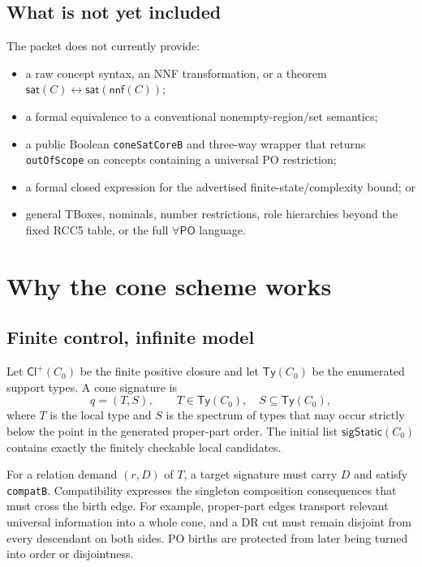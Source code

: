\documentclass[11pt]{article}
\newcommand{\PO}{\mathsf{PO}}
\newcommand{\Ty}{\mathsf{Ty}}
\newcommand{\Cl}{\mathsf{Cl}^{+}}
\newcommand{\code}[1]{\texttt{#1}}
\begin{document}
\subsection{What is not yet included}

The packet does not currently provide:
\begin{itemize}
  \item a raw concept syntax, an NNF transformation, or a theorem
  $\mathsf{sat}(C)\leftrightarrow\mathsf{sat}(\mathsf{nnf}(C))$;
  \item a formal equivalence to a conventional nonempty-region/set semantics;
  \item a public Boolean \code{coneSatCoreB} and three-way wrapper that returns
  \code{outOfScope} on concepts containing a universal PO restriction;
  \item a formal closed expression for the advertised finite-state/complexity bound;
  or
  \item general TBoxes, nominals, number restrictions, role hierarchies beyond the
  fixed RCC5 table, or the full $\forall\PO$ language.
\end{itemize}

\section{Why the cone scheme works}

\subsection{Finite control, infinite model}

Let $\Cl(C_0)$ be the finite positive closure and let $\Ty(C_0)$ be the enumerated
support types. A cone signature is
\[
  q=(T,S),\qquad T\in\Ty(C_0),\quad S\subseteq\Ty(C_0),
\]
where $T$ is the local type and $S$ is the spectrum of types that may occur strictly
below the point in the generated proper-part order. The initial list
$\mathsf{sigStatic}(C_0)$ contains exactly the finitely checkable local candidates.

For a relation demand $(r,D)$ of $T$, a target signature must carry $D$ and satisfy
\code{compatB}. Compatibility expresses the singleton composition consequences that
must cross the birth edge. For example, proper-part edges transport relevant universal
information into a whole cone, and a DR cut must remain disjoint from every descendant
on both sides. PO births are protected from later being turned into order or
disjointness.
\end{document}
